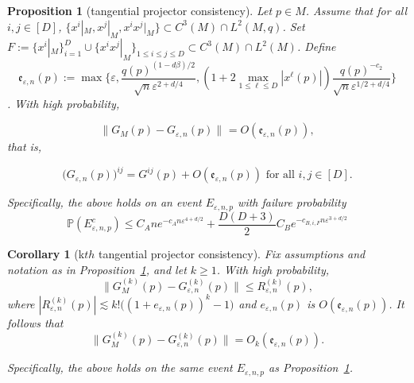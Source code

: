 \documentclass[10pt,a4paper]{amsart}
\newtheorem{proposition}{Proposition}
\newtheorem{corollary}{Corollary}
\begin{document}
\begin{proposition}[tangential projector consistency]

Let $p \in M$. Assume that for all $i,j \in[D]$, $\{ x^{i}|_{M}, x^{j}|_{M}, x^{i}x^{j} |_{M} \} \subset C^{3}(M) \cap L^{2}(M,q)$. Set $F:=\{ x^{i} |_{M} \}_{i=1}^{D} \cup \{ x^{i}x^{j} |_{M} \}_{1 \leq i \leq j \leq D} \subset C^{3}(M) \cap L^{2}(M)$. Define \[
\mathfrak{e}_{\varepsilon, n}(p):=\max \{  \varepsilon, \frac{q(p)^{(1-d \beta)/2}}{\sqrt{ n } \varepsilon^{2+d/4}}, (1+2\max_{1 \leq \ell \leq D}  |x^{\ell}(p)|) \frac{q(p)^{-c_{2}}}{\sqrt{ n } \varepsilon^{1/2+d/4}}  \}
\]. With high probability,  

\[
\| G_{M}(p) - G_{\varepsilon, n}(p)  \|_{} = O( \mathfrak{e}_{\varepsilon, n}(p) ),
\]
that is, 

$$\big(G_{\varepsilon, n}(p)\big)^{ij}=G ^{ij}(p)+O( \mathfrak{e}_{\varepsilon, n}(p) ) \text{ for all }i,j \in [D] .$$

Specifically, the above holds on an event $E_{\varepsilon, n,p}$ with failure probability $$\mathbb{P}(E_{\varepsilon, n, p}^{c}) \leq C_{A} n e ^{-c_{A}n \varepsilon^{4+d/2}}+ \frac{D(D+3)}{2} C_{B}e^{-c_{B, i, F}n \varepsilon^{3+d/2}}$$
\label{prop:tangential-projector-consistency}
\end{proposition}

\begin{corollary}[k$th$ tangential projector consistency]
Fix assumptions and notation as in Proposition~\ref{prop:tangential-projector-consistency}, and let \( k \geq 1 \). With high probability,
$$\|G^{(k)}_{M}(p)-G^{(k)}_{\varepsilon, n}(p)\| \leq R^{(k)}_{\varepsilon, n}(p),$$
where $|R^{(k)}_{\varepsilon, n}(p)|\lesssim k!\big( (1+{e}_{\varepsilon, n}(p))^{k}-1\big)^{}$ and $e_{\varepsilon,n}(p)$ is $O(\mathfrak{e}_{\varepsilon,n}(p))$. It follows that $$\|G_{M}^{(k)}(p) - G_{\varepsilon, n}^{(k)}(p)\|=O_{k}(\mathfrak{e}_{\varepsilon, n}(p)).$$

Specifically, the above holds on the same event \( E_{\varepsilon, n ,p} \) as Proposition~\ref{prop:tangential-projector-consistency}. 



\label{cor:kth-tangential-projector-consistency}
\end{corollary}
\end{document}
